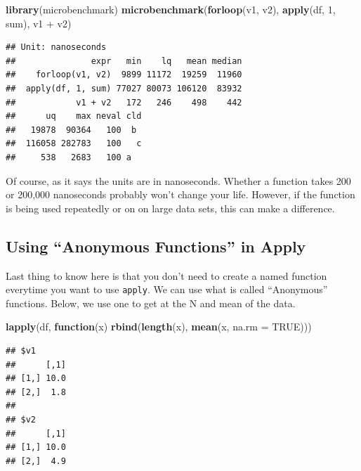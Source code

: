 \documentclass[]{tufte-book}
\newenvironment{Shaded}{}{}
\newcommand{\KeywordTok}[1]{\textcolor[rgb]{0.00,0.44,0.13}{\textbf{#1}}}
\newcommand{\DataTypeTok}[1]{\textcolor[rgb]{0.56,0.13,0.00}{#1}}
\newcommand{\DecValTok}[1]{\textcolor[rgb]{0.25,0.63,0.44}{#1}}
\newcommand{\StringTok}[1]{\textcolor[rgb]{0.25,0.44,0.63}{#1}}
\newcommand{\OtherTok}[1]{\textcolor[rgb]{0.00,0.44,0.13}{#1}}
\newcommand{\ControlFlowTok}[1]{\textcolor[rgb]{0.00,0.44,0.13}{\textbf{#1}}}
\newcommand{\OperatorTok}[1]{\textcolor[rgb]{0.40,0.40,0.40}{#1}}
\newcommand{\NormalTok}[1]{#1}
\theoremstyle{definition}
\theoremstyle{definition}
\theoremstyle{remark}
\begin{document}
\begin{Shaded}
\begin{Highlighting}[]
\KeywordTok{library}\NormalTok{(microbenchmark)}
\KeywordTok{microbenchmark}\NormalTok{(}\KeywordTok{forloop}\NormalTok{(v1, v2), }\KeywordTok{apply}\NormalTok{(df, }\DecValTok{1}\NormalTok{, sum), }
\NormalTok{    v1 }\OperatorTok{+}\StringTok{ }\NormalTok{v2)}
\end{Highlighting}
\end{Shaded}

\begin{verbatim}
## Unit: nanoseconds
##               expr   min    lq   mean median
##    forloop(v1, v2)  9899 11172  19259  11960
##  apply(df, 1, sum) 77027 80073 106120  83932
##            v1 + v2   172   246    498    442
##      uq    max neval cld
##   19878  90364   100  b 
##  116058 282783   100   c
##     538   2683   100 a
\end{verbatim}

Of course, as it says the units are in nanoseconds. Whether a function
takes 200 or 200,000 nanoseconds probably won't change your life.
However, if the function is being used repeatedly or on on large data
sets, this can make a difference.

\subsection*{\texorpdfstring{Using ``Anonymous Functions'' in
Apply}{Using Anonymous Functions in Apply}}\label{using-anonymous-functions-in-apply}

Last thing to know here is that you don't need to create a named
function everytime you want to use \texttt{apply}. We can use what is
called ``Anonymous'' functions. Below, we use one to get at the N and
mean of the data.

\begin{Shaded}
\begin{Highlighting}[]
\KeywordTok{lapply}\NormalTok{(df, }\ControlFlowTok{function}\NormalTok{(x) }\KeywordTok{rbind}\NormalTok{(}\KeywordTok{length}\NormalTok{(x), }\KeywordTok{mean}\NormalTok{(x, }
    \DataTypeTok{na.rm =} \OtherTok{TRUE}\NormalTok{)))}
\end{Highlighting}
\end{Shaded}

\begin{verbatim}
## $v1
##      [,1]
## [1,] 10.0
## [2,]  1.8
## 
## $v2
##      [,1]
## [1,] 10.0
## [2,]  4.9
\end{verbatim}
\end{document}
